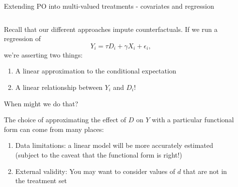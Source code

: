 \documentclass[notes,11pt, aspectratio=169]{beamer}
\newenvironment{wideitemize}{\itemize\addtolength{\itemsep}{10pt}}{\enditemize}
\begin{document}
\begin{frame}{Extending PO into multi-valued treatments - covariates and regression}
\begin{columns}[T] %
  \begin{column}{.7\textwidth}
  \begin{wideitemize}
  \item Recall that our different approaches impute counterfactuals.  If we run a regression of
    \begin{equation*}
      Y_{i} = \tau D_{i} + \gamma X_{i} + \epsilon_{i},
    \end{equation*}
    we're asserting two things:
    \begin{enumerate}
    \item A linear approximation to the conditional expectation
    \item A linear relationship between $Y_{i}$ and $D_{i}$!
    \end{enumerate}
    When might we do that?
    \vspace{-7pt}
  \item The choice of approximating the effect of $D$ on $Y$ with a particular functional form can come from many places:
    \begin{enumerate}
    \item Data limitations: a linear model will be more accurately estimated (subject to the caveat that the functional form is right!)
    \item External validity: You may want to consider values of $d$
      that are not in the treatment set
    \end{enumerate}
\end{wideitemize}    


\end{column}%
  \hfill%
  \begin{column}{.4\textwidth}
  \end{column}
\end{columns}
\end{frame}
\end{document}
